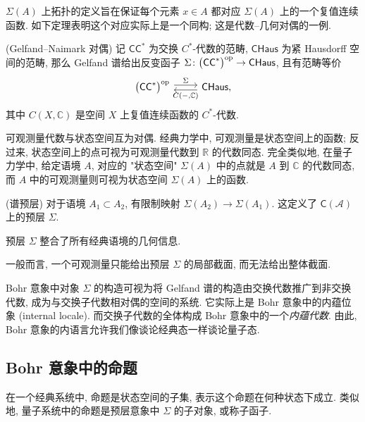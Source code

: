 $\Sigma(A)$ 上拓扑的定义旨在保证每个元素 $x\in A$ 都对应 $\Sigma(A)$ 上的一个复值连续函数. 如下定理表明这个对应实际上是一个同构; 这是代数--几何对偶的一例.

\begin{prop}
    {(Gelfand--Naimark 对偶)}
    记 $\mathsf {CC}^*$ 为交换 $C^*$-代数的范畴, $\mathsf{CHaus}$ 为紧 Hausdorff 空间的范畴,
    那么 Gelfand 谱给出反变函子 $\Sigma\colon \big(\mathsf {CC}^*\big)^{\text{op}} \to \mathsf {CHaus}$, 且有范畴等价
    \[\begin{tikzcd}[ampersand replacement=\&]
    	{\big(\mathsf {CC}^*\big)^{\op}} \& {\mathsf {CHaus},}
    	\arrow["\Sigma", shift left, from=1-1, to=1-2]
    	\arrow["{C({-},\mathbb{C})}", shift left, from=1-2, to=1-1]
    \end{tikzcd}\]
    其中 $C(X,\mathbb{C})$ 是空间 $X$ 上复值连续函数的 $C^*$-代数.
\end{prop}

可观测量代数与状态空间互为对偶. 经典力学中, 可观测量是状态空间上的函数; 反过来, 状态空间上的点可视为可观测量代数到 $\mathbb{R}$ 的代数同态.
完全类似地, 在量子力学中, 给定语境 $A$, 对应的 "状态空间" $\Sigma(A)$ 中的点就是 $A$ 到 $\mathbb{C}$ 的代数同态, 而 $A$ 中的可观测量则可视为状态空间 $\Sigma(A)$ 上的函数.

\begin{definition}
    {(谱预层)}
    对于语境 $A_1 \subset A_2$, 有限制映射 $\Sigma(A_2)\to\Sigma(A_1)$. 这定义了 $\mathsf C(\mathcal A)$ 上的预层 $\Sigma$.
\end{definition}

\begin{remark}
    {}
    预层 $\Sigma$ 整合了所有经典语境的几何信息.
    
    一般而言, 一个可观测量只能给出预层 $\Sigma$ 的局部截面, 而无法给出整体截面.
\end{remark}

Bohr 意象中对象 $\Sigma$ 的构造可视为将 Gelfand 谱的构造由交换代数推广到非交换代数, 成为与交换子代数相对偶的空间的系统. 它实际上是 Bohr 意象中的内蕴位象 (internal locale). 而交换子代数的全体构成 Bohr 意象中的一个\emph{内蕴代数}. 由此, Bohr 意象的内语言允许我们像谈论经典态一样谈论量子态.

\subsection{Bohr 意象中的命题}



在一个经典系统中, 命题是状态空间的子集, 表示这个命题在何种状态下成立.
类似地, 量子系统中的命题是预层意象中 $\Sigma$ 的子对象, 或称子函子.